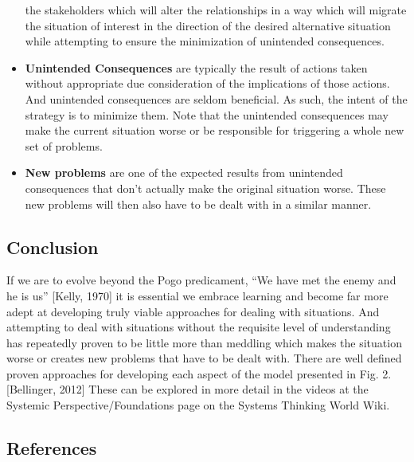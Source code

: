 \documentclass[]{memoir}
\begin{document}
\begin{itemize}
  the stakeholders which will alter the relationships in a way which
  will migrate the situation of interest in the direction of the desired
  alternative situation while attempting to ensure the minimization of
  unintended consequences.
\item
  \textbf{Unintended Consequences} are typically the result of actions
  taken without appropriate due consideration of the implications of
  those actions. And unintended consequences are seldom beneficial. As
  such, the intent of the strategy is to minimize them. Note that the
  unintended consequences may make the current situation worse or be
  responsible for triggering a whole new set of problems.
\item
  \textbf{New problems} are one of the expected results from unintended
  consequences that don't actually make the original situation worse.
  These new problems will then also have to be dealt with in a similar
  manner.
\end{itemize}

\subsection{Conclusion}

If we are to evolve beyond the Pogo predicament, ``We have met the enemy
and he is us'' {[}Kelly, 1970{]} it is essential we embrace learning and
become far more adept at developing truly viable approaches for dealing
with situations. And attempting to deal with situations without the
requisite level of understanding has repeatedly proven to be little more
than meddling which makes the situation worse or creates new problems
that have to be dealt with. There are well defined proven approaches for
developing each aspect of the model presented in Fig. 2. {[}Bellinger,
2012{]} These can be explored in more detail in the videos at the
Systemic Perspective/Foundations page on the Systems Thinking World
Wiki.

\subsection{References}
\end{document}
